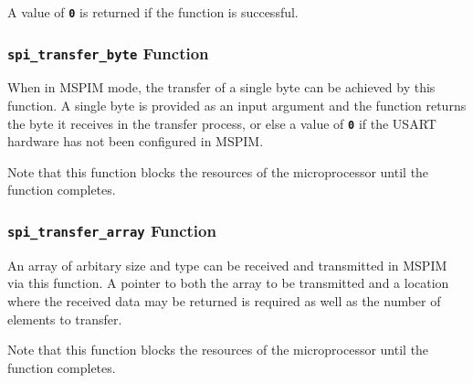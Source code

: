 \documentclass[a4paper, oneside, 11pt, titlepage, onecolumn, openright]{article}
\begin{document}
			A value of \textbf{\texttt{0}} is returned if the function is successful.
			
\subsubsection{\textbf{\texttt{spi\_transfer\_byte}} Function}
			\label{sss:HALusartMasterSPIModespi_transfer_byteFunctions}
			
			When in MSPIM mode, the transfer of a single byte can be achieved by this function. A single byte is provided as an input argument and the function returns the byte it receives in the transfer process, or else a value of \textbf{\texttt{0}} if the USART hardware has not been configured in MSPIM.
	
			Note that this function blocks the resources of the microprocessor until the function completes.
			
\subsubsection{\textbf{\texttt{spi\_transfer\_array}} Function}
			\label{sss:HALusartMasterSPIModespi_transfer_arrayFunctions}
			
			An array of arbitary size and type can be received and transmitted in MSPIM via this function. A pointer to both the array to be transmitted and a location where the received data may be returned is required as well as the number of elements to transfer.
			
			Note that this function blocks the resources of the microprocessor until the function completes.



	\appendix
\end{document}
